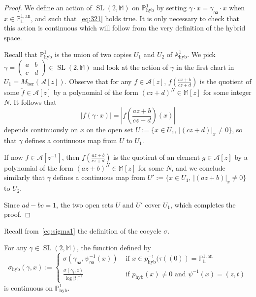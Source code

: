 \documentclass[AHL,Unicode,longabstracts]{cedram}
\DeclareMathOperator{\hyb}{hyb}
\DeclareMathOperator{\SL}{SL}
\newcommand{\cA}{\mathcal{A}}
\newcommand{\mm}{\mathbb{M}}
\newcommand{\A}{{\mathbb A}}
\newcommand{\an}{\mathrm{an}}
\newcommand{\PP}{\mathbb{P}}
\newcommand{\Laurent}{\mathbb{L}}
\newcommand{\lrpar}[1]{\left(#1\right)}
\newcommand{\na}{\mathsf{na}}
\newcommand{\inv}{^{-1}}
\begin{document}
\begin{proof}
We define an action of $\SL(2,\mm)$ on $\PP^1_{\hyb}$ by setting $\gamma \cdot x = \gamma_{\na} \cdot x$ when $x\in \PP^{1,\an}_{\Laurent}$, and such that~\eqref{eq:321} holds true. It is only necessary to check that this action is continuous which will follow from the very definition of the hybrid space.

Recall that $\PP^1_{\hyb}$ is the union of two copies $U_1$ and $U_2$ of $\A^1_{\hyb}$. We pick $\gamma = \lrpar{
\begin{smallmatrix} a & b \\ c & d
\end{smallmatrix}} \in \SL(2,\mm)$
and look at the action of $\gamma$ in the first chart in $U_1= M_{\mathrm{ber}}(\cA[z])$. Observe that for any $f\in \cA[z]$, $f(\frac{az+b}{cz+d})$ is the quotient of some $\widetilde{f}\in \cA[z]$ by a polynomial of the form $(cz+d)^N\in \mm[z]$ for some integer $N$. It follows that
\[
|f(\gamma \cdot x)| = \left|f\left(\frac{az+b}{cz+d}\right) (x)\right|
\]
depends continuously on $x$ on the open set $U:= \{x\in U_1, \, |(cz+d)|_x\neq 0\}$, so that $\gamma$ defines a continuous map from $U$ to $U_1$.

If now $f\in \cA[z^{-1}]$, then $f(\frac{az+b}{cz+d})$ is the quotient of an element $g\in \cA[z]$ by a polynomial of the form $(az+b)^N\in \mm[z]$ for some $N$, and we conclude similarly that $\gamma$ defines a continuous map from $U':= \{x\in U_1, \, |(az+b)|_x\neq 0\}$ to $U_2$.

Since $ad-bc =1$, the two open sets $U$ and $U'$ cover $U_1$, which completes the proof.
\end{proof}

Recall from~\eqref{eq:sigma1} the definition of the cocycle $\sigma$.

\begin{prop}\label{prop:hybrid sigma}
For any $\gamma\in \SL(2,\mm)$, the function defined by
\[
\sigma_{\hyb}(\gamma,x) :=
\begin{cases}
\sigma(\gamma_\na,\psi_\na\inv(x)) & \text{ if } x \in p_{\hyb}^{-1}(\tau((0)) = \PP^{1,\an}_{\Laurent}
\\
\frac{\sigma(\gamma_t,z)}{\log\mathopen|t\mathclose|^{-1}}& \text{ if } p_{\hyb}(x) \neq 0 \text{ and } \psi^{-1}(x) = (z,t)
\end{cases}
\]
is continuous on $\PP^1_{\hyb}$.
\end{prop}
\end{document}
